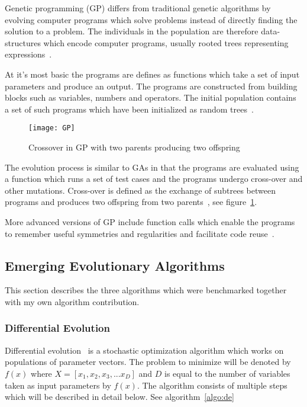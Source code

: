 Genetic programming (GP) differs from traditional genetic algorithms by evolving computer programs which solve problems instead of directly finding the solution to a problem. The individuals in the population are therefore data-structures which encode computer programs, usually rooted trees representing expressions~\cite{Michalewicz1997}.

At it's most basic the programs are defines as functions which take a set of input parameters and produce an output. The programs are constructed from building blocks such as variables, numbers and operators. The initial population contains a set of such programs which have been initialized as random trees~\cite{Michalewicz1997}.

\begin{figure}[H]
  \centering
  \texttt{[image: GP]}
  \caption{Crossover in GP with two parents producing two offspring}
  \label{fig:GP}
\end{figure}

The evolution process is similar to GAs in that the programs are evaluated using a function which runs a set of test cases and the programs undergo cross-over and other mutations. Cross-over is defined as the exchange of subtrees between programs and produces two offspring from two parents~\cite{Michalewicz1997}, see figure~\ref{fig:GP}.

More advanced versions of GP include function calls which enable the programs to remember useful symmetries and regularities and facilitate code reuse~\cite{Michalewicz1997}.

\subsection{Emerging Evolutionary Algorithms}

This section describes the three algorithms which were benchmarked together with my own algorithm contribution. 

\subsubsection{Differential Evolution}

Differential evolution~\cite{Storn1997} is a stochastic optimization algorithm which works on populations of parameter vectors. The problem to minimize will be denoted by $f(x)$ where $X=[x_1,x_2,x_3,...x_D]$ and $D$ is equal to the number of variables taken as input parameters by $f(x)$. The algorithm consists of multiple steps which will be described in detail below. See algorithm~\ref{algo:de}

